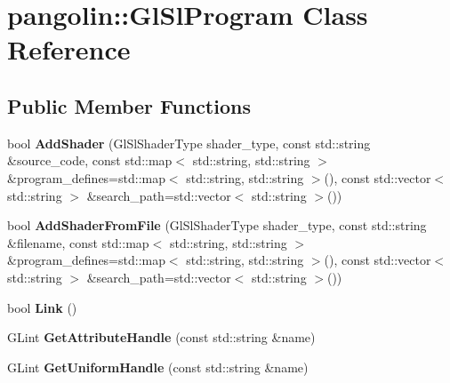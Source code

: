 \hypertarget{classpangolin_1_1_gl_sl_program}{}\section{pangolin\+:\+:Gl\+Sl\+Program Class Reference}
\label{classpangolin_1_1_gl_sl_program}
\subsection*{Public Member Functions}
\begin{DoxyCompactItemize}
\item 
bool {\bfseries Add\+Shader} (Gl\+Sl\+Shader\+Type shader\+\_\+type, const std\+::string \&source\+\_\+code, const std\+::map$<$ std\+::string, std\+::string $>$ \&program\+\_\+defines=std\+::map$<$ std\+::string, std\+::string $>$(), const std\+::vector$<$ std\+::string $>$ \&search\+\_\+path=std\+::vector$<$ std\+::string $>$())\hypertarget{classpangolin_1_1_gl_sl_program_a6880948ce17871643d9d7f1fea79e40f}{}\label{classpangolin_1_1_gl_sl_program_a6880948ce17871643d9d7f1fea79e40f}

\item 
bool {\bfseries Add\+Shader\+From\+File} (Gl\+Sl\+Shader\+Type shader\+\_\+type, const std\+::string \&filename, const std\+::map$<$ std\+::string, std\+::string $>$ \&program\+\_\+defines=std\+::map$<$ std\+::string, std\+::string $>$(), const std\+::vector$<$ std\+::string $>$ \&search\+\_\+path=std\+::vector$<$ std\+::string $>$())\hypertarget{classpangolin_1_1_gl_sl_program_afcf996e6d0de9b3a153de63e6d36ccdd}{}\label{classpangolin_1_1_gl_sl_program_afcf996e6d0de9b3a153de63e6d36ccdd}

\item 
bool {\bfseries Link} ()\hypertarget{classpangolin_1_1_gl_sl_program_a335888bedc6c9efd37b6c4313a80febc}{}\label{classpangolin_1_1_gl_sl_program_a335888bedc6c9efd37b6c4313a80febc}

\item 
G\+Lint {\bfseries Get\+Attribute\+Handle} (const std\+::string \&name)\hypertarget{classpangolin_1_1_gl_sl_program_a0445181368ce89c014e95a15bfd1b905}{}\label{classpangolin_1_1_gl_sl_program_a0445181368ce89c014e95a15bfd1b905}

\item 
G\+Lint {\bfseries Get\+Uniform\+Handle} (const std\+::string \&name)\hypertarget{classpangolin_1_1_gl_sl_program_a84634c0ec52ade204eb77f96f73f0266}{}\label{classpangolin_1_1_gl_sl_program_a84634c0ec52ade204eb77f96f73f0266}


\end{DoxyCompactItemize}
